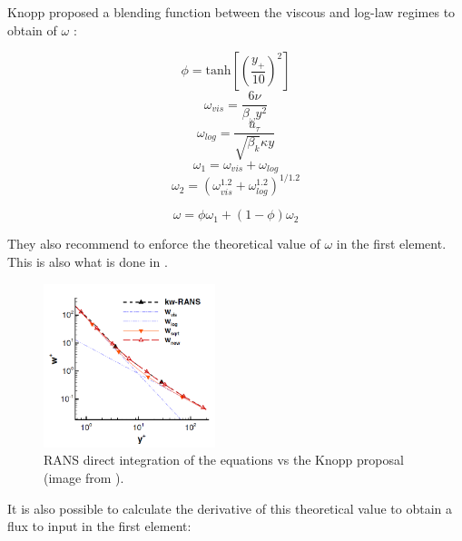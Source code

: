 Knopp proposed a blending function between the viscous and log-law regimes to obtain of $\omega$ \cite{Knopp2007}:

\begin{equation}
	\phi = \text{tanh}\left[\left(\frac{y_+}{10}\right)^2\right]
\end{equation}
\begin{equation}
	\omega_{vis} = \frac{6\nu}{\beta_\omega y^2}
\end{equation}
\begin{equation}
	\omega_{log} = \frac{u_\tau}{\sqrt{\beta_k}\kappa y}
\end{equation}
\begin{equation}
	\omega_{1} = \omega_{vis}+\omega_{log}
\end{equation}
\begin{equation}
	\omega_{2} =(\omega_{vis}^{1.2}+\omega_{log}^{1.2})^{1/1.2}
\end{equation}

\begin{equation}\label{eq_omega_Knopp}
	\omega = \phi \omega_{1} + (1-\phi) \omega_{2}
\end{equation}

They also recommend to enforce the theoretical value of $\omega$ in the first element. This is also what is done in \cite{Fun3D2015}. \\

\begin{figure}[h]
	\centering
	\includegraphics[width= 5cm]{Knopp_omega.png}
	\caption{RANS direct integration of the equations vs the Knopp proposal (image from \cite{Knopp2007}).}
\end{figure}

It is also possible to calculate the derivative of this theoretical value to obtain a flux to input in the first element:

